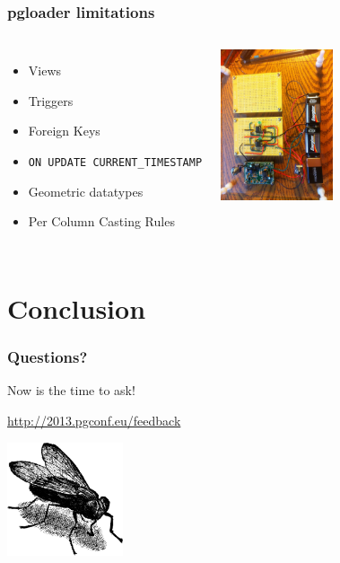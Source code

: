 \documentclass{beamer}
\begin{document}
\begin{frame}[fragile]
  \frametitle{pgloader limitations}
  
  \vfill

\begin{columns}

  \begin{itemize}
  \item Views
  \item Triggers
  \item Foreign Keys
  \item \texttt{ON UPDATE CURRENT\_TIMESTAMP}
  \item Geometric datatypes
  \item Per Column Casting Rules
  \end{itemize}

\begin{center}
  \includegraphics[height=12em]{niy.jpg}
\end{center}
\end{columns}
\end{frame}

\section{Conclusion}

\begin{frame}
  \frametitle{Questions?}

\begin{center}
  Now is the time to ask!
  \vfill
  \begin{center}\url{http://2013.pgconf.eu/feedback}\end{center}
  \vfill

  \includegraphics[height=9em]{fly.png}
\end{center}
\end{frame}
\end{document}
